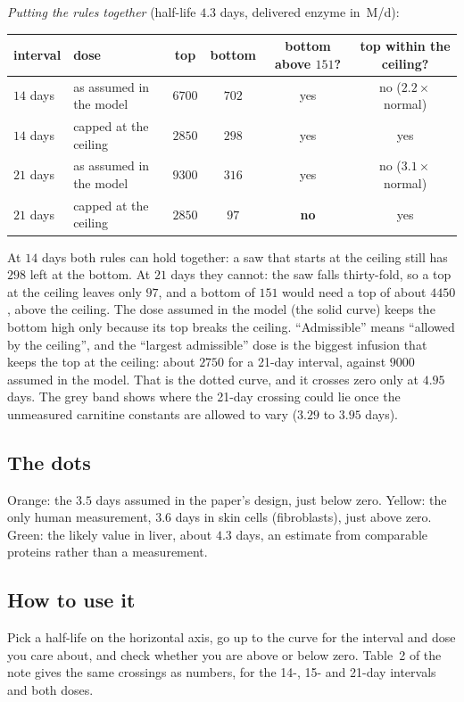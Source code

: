 \documentclass[11pt,a4paper]{article}
\newcommand{\um}{\,\textmu M/d}
\begin{document}
\emph{Putting the rules together} (half-life $4.3$ days, delivered enzyme in \um):
\begin{center}\small
\begin{tabular}{@{}llcccc@{}}
\toprule
interval & dose & top & bottom & bottom above $151$? & top within the ceiling? \\
\midrule
$14$ days & as assumed in the model & $6700$ & $702$ & yes & no ($2.2\times$ normal) \\
$14$ days & capped at the ceiling & $2850$ & $298$ & yes & yes \\
$21$ days & as assumed in the model & $9300$ & $316$ & yes & no ($3.1\times$ normal) \\
$21$ days & capped at the ceiling & $2850$ & $97$ & \textbf{no} & yes \\
\bottomrule
\end{tabular}
\end{center}
At $14$ days both rules can hold together: a saw that starts at the ceiling still has $298$ left
at the bottom. At $21$ days they cannot: the saw falls thirty-fold, so a top at the ceiling leaves
only $97$, and a bottom of $151$ would need a top of about $4450$, above the ceiling. The dose
assumed in the model (the solid curve) keeps the bottom high only because its top breaks the
ceiling. ``Admissible'' means ``allowed by the ceiling'', and the ``largest admissible'' dose is
the biggest infusion that keeps the top at the ceiling: about $2750$ for a 21-day interval,
against $9000$ assumed in the model. That is the dotted curve, and it crosses zero only at
$4.95$ days. The grey band shows where the 21-day crossing could lie once
the unmeasured carnitine constants are allowed to vary ($3.29$ to $3.95$ days).

\subsection{The dots} Orange: the $3.5$ days assumed in the paper's design, just below zero.
Yellow: the only human measurement, $3.6$ days in skin cells (fibroblasts), just above zero.
Green: the likely value in liver, about $4.3$ days, an estimate from comparable proteins rather
than a measurement.

\subsection{How to use it} Pick a half-life on the horizontal axis, go up to the curve for the
interval and dose you care about, and check whether you are above or below zero. Table~2 of the
note gives the same crossings as numbers, for the 14-, 15- and 21-day intervals and both doses.
\end{document}
